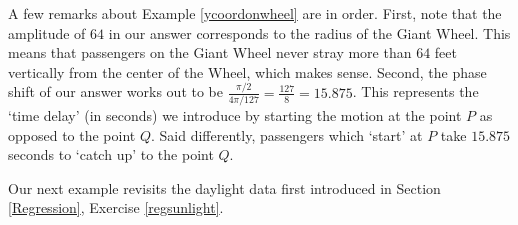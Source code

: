A few remarks about Example \ref{ycoordonwheel} are in order.  First, note that the amplitude of $64$ in our answer corresponds to the radius of the Giant Wheel.  This means that passengers on the Giant Wheel never stray more than $64$ feet vertically from the center of the Wheel, which makes sense.  Second, the phase shift of our answer works out to be $\frac{\pi/2}{4\pi/127} = \frac{127}{8} = 15.875$.  This represents the `time delay' (in seconds) we introduce by starting the motion at the point $P$ as opposed to the point $Q$.  Said differently, passengers which `start' at $P$ take  $15.875$ seconds to `catch up' to the point $Q$.  

\medskip

Our next example revisits the daylight data first introduced in Section \ref{Regression}, Exercise \ref{regsunlight}.


